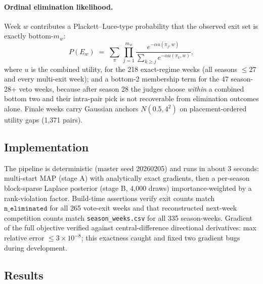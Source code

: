 \documentclass[11pt]{article}
\begin{document}
\paragraph{Ordinal elimination likelihood.} Week $w$ contributes a
Plackett--Luce-type probability that the observed exit set is exactly
bottom-$m_w$:
\begin{equation}
P(E_w) \;=\; \sum_{\pi} \, \prod_{j=1}^{m_w}
\frac{e^{-\alpha u(\pi_j,w)}}{\sum_{k \ge j} e^{-\alpha u(\pi_k,w)}},
\label{eq:pl}
\end{equation}
where $u$ is the combined utility, for the 218 exact-regime weeks (all seasons
$\le 27$ and every multi-exit week); and a bottom-2 membership term for the 47
season-28+ veto weeks, because after season 28 the judges choose \emph{within} a
combined bottom two and their intra-pair pick is not recoverable from elimination
outcomes alone. Finale weeks carry Gaussian anchors $N(0.5, 4^2)$ on
placement-ordered utility gaps (1{,}371 pairs).

\subsection{Implementation}

The pipeline is deterministic (master seed 20260205) and runs in about 3 seconds:
multi-start MAP (stage A) with analytically exact gradients, then a per-season
block-sparse Laplace posterior (stage B, 4{,}000 draws) importance-weighted by a
rank-violation factor. Build-time assertions verify exit counts match
$\texttt{n\_eliminated}$ for all 265 vote-exit weeks and that reconstructed
next-week competition counts match \texttt{season\_weeks.csv} for all 335
season-weeks. Gradient of the full objective verified against central-difference
directional derivatives: max relative error $\le 3\times10^{-8}$; this exactness
caught and fixed two gradient bugs during development.

\subsection{Results}
\end{document}
